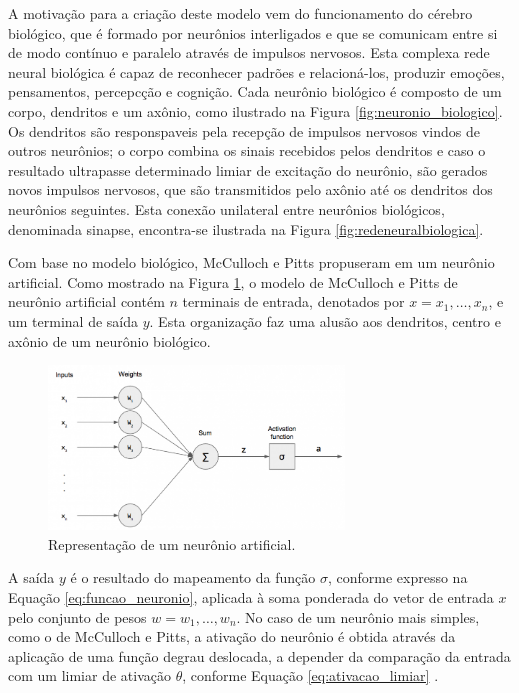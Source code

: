 A motivação para a criação deste modelo vem do funcionamento do cérebro biológico, que é formado por neurônios interligados e que se comunicam entre si de modo contínuo e paralelo através de impulsos nervosos. Esta complexa rede neural biológica é capaz de reconhecer padrões e relacioná-los, produzir emoções, pensamentos, percepcção e cognição. Cada neurônio biológico é composto de um corpo, dendritos e um axônio, como ilustrado na Figura \ref{fig:neuronio_biologico}. Os dendritos são responspaveis pela recepção de impulsos nervosos vindos de outros neurônios; o corpo combina os sinais recebidos pelos dendritos e caso o resultado ultrapasse determinado limiar de excitação do neurônio, são gerados novos impulsos nervosos, que são transmitidos pelo axônio até os dendritos dos neurônios seguintes. Esta conexão unilateral entre neurônios biológicos, denominada sinapse, encontra-se ilustrada na Figura \ref{fig:redeneuralbiologica}.

Com base no modelo biológico, McCulloch e Pitts propuseram em \cite{mcculloch1943logical} um neurônio artificial. Como mostrado na Figura \ref{fig:neuronio}, o modelo de McCulloch e Pitts de neurônio artificial contém $n$ terminais de entrada, denotados por $x = x_1, \ldots, x_n$, e um terminal de saída $y$. Esta organização faz uma alusão aos dendritos, centro e axônio de um neurônio biológico.

\begin{figure}[ht]
	\centering
	\caption{Representação de um neurônio artificial.}
	\label{fig:neuronio}
	\includegraphics[width=0.7\textwidth]{img/perceptron.png}
\end{figure}

A saída $y$ é o resultado do mapeamento da função $\sigma$, conforme expresso na Equação \ref{eq:funcao_neuronio}, aplicada à soma ponderada do vetor de entrada $x$ pelo conjunto de pesos $w = w_1, \ldots, w_n$. No caso de um neurônio mais simples, como o de McCulloch e Pitts, a ativação do neurônio é obtida através da aplicação de uma função degrau deslocada, a depender da comparação da entrada com um limiar de ativação $\theta$, conforme Equação \ref{eq:ativacao_limiar} \cite{mcculloch1943logical}.

